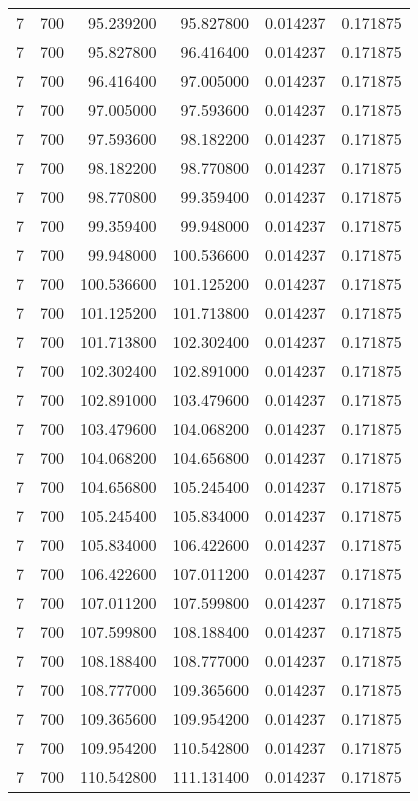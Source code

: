 \begin{longtable}{rrrrrr}
7 & 700 & 95.239200 & 95.827800 & 0.014237 & 0.171875 \\
7 & 700 & 95.827800 & 96.416400 & 0.014237 & 0.171875 \\
7 & 700 & 96.416400 & 97.005000 & 0.014237 & 0.171875 \\
7 & 700 & 97.005000 & 97.593600 & 0.014237 & 0.171875 \\
7 & 700 & 97.593600 & 98.182200 & 0.014237 & 0.171875 \\
7 & 700 & 98.182200 & 98.770800 & 0.014237 & 0.171875 \\
7 & 700 & 98.770800 & 99.359400 & 0.014237 & 0.171875 \\
7 & 700 & 99.359400 & 99.948000 & 0.014237 & 0.171875 \\
7 & 700 & 99.948000 & 100.536600 & 0.014237 & 0.171875 \\
7 & 700 & 100.536600 & 101.125200 & 0.014237 & 0.171875 \\
7 & 700 & 101.125200 & 101.713800 & 0.014237 & 0.171875 \\
7 & 700 & 101.713800 & 102.302400 & 0.014237 & 0.171875 \\
7 & 700 & 102.302400 & 102.891000 & 0.014237 & 0.171875 \\
7 & 700 & 102.891000 & 103.479600 & 0.014237 & 0.171875 \\
7 & 700 & 103.479600 & 104.068200 & 0.014237 & 0.171875 \\
7 & 700 & 104.068200 & 104.656800 & 0.014237 & 0.171875 \\
7 & 700 & 104.656800 & 105.245400 & 0.014237 & 0.171875 \\
7 & 700 & 105.245400 & 105.834000 & 0.014237 & 0.171875 \\
7 & 700 & 105.834000 & 106.422600 & 0.014237 & 0.171875 \\
7 & 700 & 106.422600 & 107.011200 & 0.014237 & 0.171875 \\
7 & 700 & 107.011200 & 107.599800 & 0.014237 & 0.171875 \\
7 & 700 & 107.599800 & 108.188400 & 0.014237 & 0.171875 \\
7 & 700 & 108.188400 & 108.777000 & 0.014237 & 0.171875 \\
7 & 700 & 108.777000 & 109.365600 & 0.014237 & 0.171875 \\
7 & 700 & 109.365600 & 109.954200 & 0.014237 & 0.171875 \\
7 & 700 & 109.954200 & 110.542800 & 0.014237 & 0.171875 \\
7 & 700 & 110.542800 & 111.131400 & 0.014237 & 0.171875 \\

\end{longtable}
